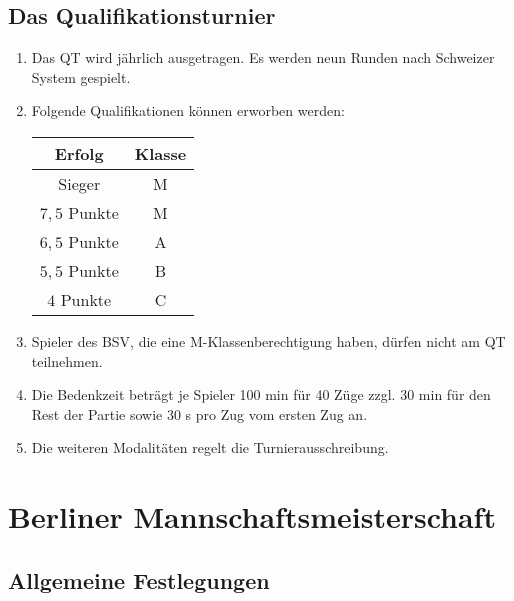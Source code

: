 \documentclass[fontsize=12pt, paper=a4, ngerman]{article}
\begin{document}
\subsection{Das Qualifikationsturnier}

\begin{enumerate}
\item Das QT wird jährlich ausgetragen. Es werden neun Runden nach Schweizer System gespielt.
\item Folgende Qualifikationen können erworben werden:

\begin{tabular}{c | c} 
Erfolg & Klasse \\
\hline
Sieger & M \\
$7,5$ Punkte & M \\
$6,5$ Punkte & A \\
$5,5$ Punkte & B \\
$4$ Punkte & C
\end{tabular}

\item Spieler des BSV, die eine M-Klassenberechtigung haben, dürfen nicht am QT teilnehmen.
\item Die Bedenkzeit beträgt je Spieler 100 min für 40 Züge zzgl. 30 min für den Rest der Partie sowie 30 s pro Zug vom ersten Zug an.
\item Die weiteren Modalitäten regelt die Turnierausschreibung.
\end{enumerate}

\section{Berliner Mannschaftsmeisterschaft}

\subsection{Allgemeine Festlegungen}
\end{document}
